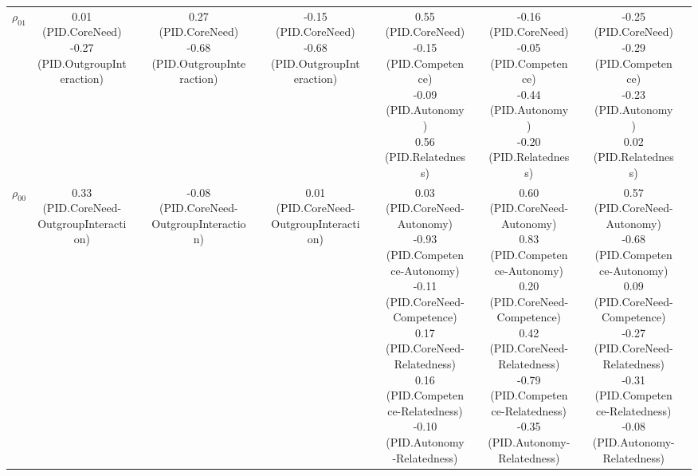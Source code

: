 \begin{landscape}
\begin{table}
\begin{minipage}[t][\textheight][t]{\textwidth}
{\begin{tabular}[t]{lcccccccccccc}
\hspace{1em}$\rho_{01}$ & \makecell[c]{ 0.01 (PID.CoreNeed)\\-0.27 (PID.OutgroupInteraction)} &  & \makecell[c]{ 0.27 (PID.CoreNeed)\\-0.68 (PID.OutgroupInteraction)} &  & \makecell[c]{-0.15 (PID.CoreNeed)\\-0.68 (PID.OutgroupInteraction)} &  & \makecell[c]{ 0.55 (PID.CoreNeed)\\-0.15 (PID.Competence)\\-0.09 (PID.Autonomy)\\ 0.56 (PID.Relatedness)} &  & \makecell[c]{-0.16 (PID.CoreNeed)\\-0.05 (PID.Competence)\\-0.44 (PID.Autonomy)\\-0.20 (PID.Relatedness)} &  & \makecell[c]{-0.25 (PID.CoreNeed)\\-0.29 (PID.Competence)\\-0.23 (PID.Autonomy)\\ 0.02 (PID.Relatedness)} & \\
\hspace{1em}$\rho_{00}$ & 0.33 (PID.CoreNeed-OutgroupInteraction) &  & -0.08 (PID.CoreNeed-OutgroupInteraction) &  & 0.01 (PID.CoreNeed-OutgroupInteraction) &  & \makecell[c]{ 0.03 (PID.CoreNeed-Autonomy)\\-0.93 (PID.Competence-Autonomy)\\-0.11 (PID.CoreNeed-Competence)\\ 0.17 (PID.CoreNeed-Relatedness)\\ 0.16 (PID.Competence-Relatedness)\\-0.10 (PID.Autonomy-Relatedness)} &  & \makecell[c]{ 0.60 (PID.CoreNeed-Autonomy)\\ 0.83 (PID.Competence-Autonomy)\\ 0.20 (PID.CoreNeed-Competence)\\ 0.42 (PID.CoreNeed-Relatedness)\\-0.79 (PID.Competence-Relatedness)\\-0.35 (PID.Autonomy-Relatedness)} &  & \makecell[c]{ 0.57 (PID.CoreNeed-Autonomy)\\-0.68 (PID.Competence-Autonomy)\\ 0.09 (PID.CoreNeed-Competence)\\-0.27 (PID.CoreNeed-Relatedness)\\-0.31 (PID.Competence-Relatedness)\\-0.08 (PID.Autonomy-Relatedness)} & \\

\end{tabular}}
\end{minipage}
\end{table}
\end{landscape}

